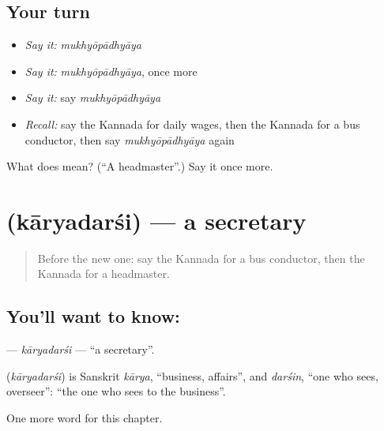 \subsection*{Your turn}
\begin{itemize}
\raggedright
  \item \emph{Say it:} \emph{mukhyōpādhyāya}
  \item \emph{Say it:} \emph{mukhyōpādhyāya}, once more
  \item \emph{Say it:} say \emph{mukhyōpādhyāya}
  \item \emph{Recall:} say the Kannada for daily wages, then the Kannada for a bus conductor, then say \emph{mukhyōpādhyāya} again
\end{itemize}

\begin{tcolorbox}[breakable,colback=teal!4,colframe=teal!35!black,title={Before you move on}]
What does  mean? (\textquotedblleft{}A headmaster\textquotedblright{}.) Say it once more.
\end{tcolorbox}
\section[\texorpdfstring{\kn{ಕಾರ್ಯದರ್ಶಿ} (kāryadarśi)}{ಕಾರ್ಯದರ್ಶಿ (kāryadarśi)}]{ (kāryadarśi) — a secretary}

\label{lesson:KA-C197-karyadarsi}



\begin{quote}
Before the new one: say the Kannada for a bus conductor, then the Kannada for a headmaster.
\end{quote}

\subsection*{You'll want to know: }
\textbf{} — \emph{kāryadarśi} — \textquotedblleft{}a secretary\textquotedblright{}.

\begin{cousinweb}
\textbf{} (\emph{kāryadarśi}) is Sanskrit \emph{kārya}, \textquotedblleft{}business, affairs\textquotedblright{}, and \emph{darśin}, \textquotedblleft{}one who sees, overseer\textquotedblright{}: \textquotedblleft{}the one who sees to the business\textquotedblright{}.
\end{cousinweb}

\begin{grammarlens}[title={What you've built}]
One more word for this chapter.
\end{grammarlens}

